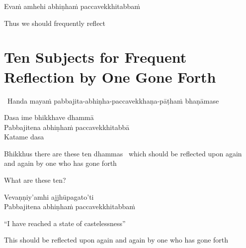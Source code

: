 Evaṁ amhehi abhiṇhaṁ paccavekkhitabbaṁ

\begin{english}
  Thus we should frequently reflect\makeatletter\hyperlink{endnote146-appendix}\makeatother
\end{english}

\suttaRef{[AN 5.57]}




\section{Ten Subjects for Frequent Reflection by One Gone Forth}
\label{ten-reflections}

\begin{leader}
  \anglebracketleft\ \hspace{-0.5mm}Handa mayaṁ pabbajita-abhiṇha-paccavekkhaṇa-pāṭhaṁ bhaṇāmase \hspace{-0.5mm}\anglebracketright\
\end{leader}

Dasa ime bhikkhave dhammā\\
Pabbajitena abhiṇhaṁ paccavekkhitabbā\\
Katame dasa

\begin{english-hang-verses}
  Bhikkhus there are these ten dhammas\makeatletter\hyperlink{endnote99-appendix}\makeatother
  \breathmark\ which should be reflected upon again and again by one who has gone forth\\
\end{english-hang-verses}

\begin{english}
  What are these ten?
\end{english}

Vevaṇṇiy'amhi ajjhūpagato'ti\\
Pabbajitena abhiṇhaṁ paccavekkhitabbaṁ

\begin{english-verses}
  ``I have reached a state of castelessness''\makeatletter\hyperlink{endnote100-appendix}\makeatother
  \begin{english-hangtogether-verses}
    This should be reflected upon again and again by one who has gone forth
  \end{english-hangtogether-verses}
\end{english-verses}


